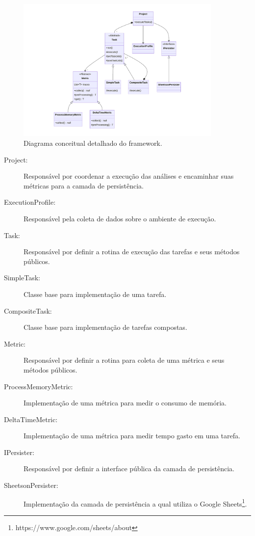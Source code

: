\documentclass[12pt]{tcc}
\begin{document}
\begin{figure}[!ht]
	\centering
	\includegraphics[width=0.9\textwidth]{figures/diagrama-classes.pdf}
	\caption{Diagrama conceitual detalhado do framework.}
	\label{fig:diag-classes}
\end{figure}


\begin{description}
	\item[Project:] Responsável por coordenar a execução das análises e encaminhar suas métricas para a camada de persistência.
	\item[ExecutionProfile:] Responsável pela coleta de dados sobre o ambiente de execução.
	\item[Task:] Responsável por definir a rotina de execução das tarefas e seus métodos públicos.
	\item[SimpleTask:] Classe base para implementação de uma tarefa.
	\item[CompositeTask:] Classe base para implementação de tarefas compostas.
	\item[Metric:] Responsável por definir a rotina para coleta de uma métrica e seus métodos públicos.
	\item[ProcessMemoryMetric:] Implementação de uma métrica para medir o consumo de memória.
	\item[DeltaTimeMetric:] Implementação de uma métrica para medir tempo gasto em uma tarefa.
	\item[IPersister:] Responsável por definir a interface pública da camada de persistência.
	\item[SheetsonPersister:] Implementação da camada de persistência a qual utiliza o Google Sheets\footnote{https://www.google.com/sheets/about}.
\end{description}
\end{document}
